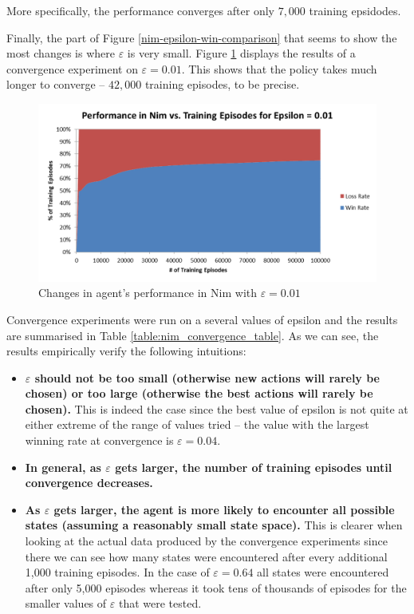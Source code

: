 \documentclass[11pt,a4paper]{report}
\begin{document}
More specifically, the performance converges after only $7,000$ training epsidodes.

Finally, the part of Figure \ref{nim-epsilon-win-comparison} that seems to show the most changes is where $\varepsilon$ is very small. Figure \ref{nim-0-01-convergence} displays the results of a convergence experiment on $\varepsilon = 0.01$. This shows that the policy takes much longer to converge -- $42,000$ training episodes, to be precise.

\begin{figure}[htbp]
	\begin{center}
		\includegraphics[width=125mm]{Nim_PerformanceResults_0_01.png}
		\caption{Changes in agent's performance in Nim with $\varepsilon = 0.01$}
		\label{nim-0-01-convergence}
	\end{center}
\end{figure}

Convergence experiments were run on a several values of epsilon and the results are summarised in Table \ref{table:nim_convergence_table}. As we can see, the results empirically verify the following intuitions:

\begin{itemize}

	\item \textbf{$\varepsilon$ should not be too small (otherwise new actions will rarely be chosen) or too large (otherwise the best actions will rarely be chosen).} This is indeed the case since the best value of epsilon is not quite at either extreme of the range of values tried -- the value with the largest winning rate at convergence is $\varepsilon = 0.04$.

	\item \textbf{In general, as $\varepsilon$ gets larger, the number of training episodes until convergence decreases.}

	\item \textbf{As $\varepsilon$ gets larger, the agent is more likely to encounter all possible states (assuming a reasonably small state space).} This is clearer when looking at the actual data produced by the convergence experiments since there we can see how many states were encountered after every additional 1,000 training episodes. In the case of $\varepsilon = 0.64$ all states were encountered after only 5,000 episodes whereas it took tens of thousands of episodes for the smaller values of $\varepsilon$ that were tested.

\end{itemize}
\end{document}
